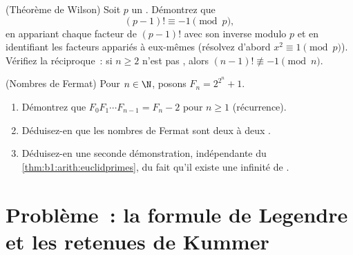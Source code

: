 \begin{exercise}[$\star\star\star$]\label{exo:b1:arith:11}
(Théorème de Wilson) Soit $p$ un . Démontrez que
\[
(p-1)! \equiv -1 \pmod p ,
\]
en appariant chaque facteur de $(p-1)!$ avec son inverse modulo $p$ et
en identifiant les facteurs appariés à eux-mêmes (résolvez d'abord $x^2 \equiv 1 \pmod p$).
Vérifiez la réciproque~: si $n \geq 2$ n'est pas , alors $(n-1)!
\not\equiv -1 \pmod n$.
\end{exercise}

\begin{exercise}[$\star\star\star$]\label{exo:b1:arith:12}
(Nombres de Fermat) Pour $n \in \N$, posons $F_n = 2^{2^n} + 1$.
\begin{enumerate}
  \item Démontrez que $F_0 F_1 \cdots F_{n-1} = F_n - 2$ pour $n \geq
        1$ (récurrence).
  \item Déduisez-en que les nombres de Fermat sont deux à deux .
  \item Déduisez-en une seconde démonstration, indépendante du
        \cref{thm:b1:arith:euclidprimes}, du fait qu'il existe une
        infinité de .
\end{enumerate}
\end{exercise}

\section{Problème~: la formule de Legendre et les retenues de Kummer}

